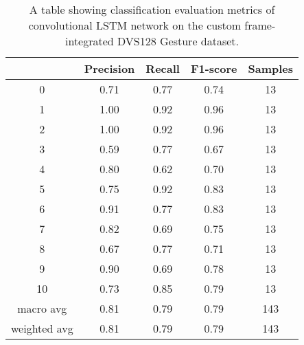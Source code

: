 \begin{table}[htb]
    \centering
    \begin{tabular}{|| c | c | c | c | c ||}
        \hline
             & Precision & Recall & F1-score & Samples \\
        \hline \hline
        0            & 0.71 & 0.77 & 0.74 & 13  \\
        \hline
        1            & 1.00 & 0.92 & 0.96 & 13  \\
        \hline
        2            & 1.00 & 0.92 & 0.96 & 13  \\
        \hline
        3            & 0.59 & 0.77 & 0.67 & 13  \\
        \hline
        4            & 0.80 & 0.62 & 0.70 & 13  \\
        \hline
        5            & 0.75 & 0.92 & 0.83 & 13  \\
        \hline
        6            & 0.91 & 0.77 & 0.83 & 13  \\
        \hline
        7            & 0.82 & 0.69 & 0.75 & 13  \\
        \hline
        8            & 0.67 & 0.77 & 0.71 & 13  \\
        \hline
        9            & 0.90 & 0.69 & 0.78 & 13  \\
        \hline
        10           & 0.73 & 0.85 & 0.79 & 13  \\
        \hline
        macro avg    & 0.81 & 0.79 & 0.79 & 143 \\
        \hline
        weighted avg & 0.81 & 0.79 & 0.79 & 143 \\
        \hline
    \end{tabular}
    \caption{A table showing classification evaluation metrics of convolutional LSTM network on the custom frame-integrated DVS128 Gesture dataset.}
    \label{tab:conv_lstm_dvs128_custom_frame_evaluation_metrics}
\end{table}

